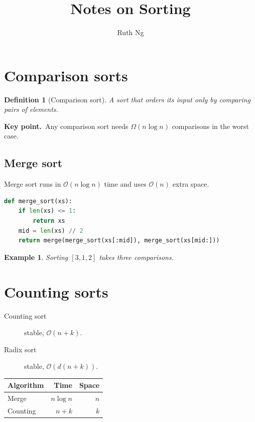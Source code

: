 \documentclass{article}
\title{Notes on Sorting}
\author{Ruth Ng}
\newtheorem{definition}{Definition}
\newtheorem{example}{Example}
\newcommand{\Oh}[1]{\mathcal{O}\!\left(#1\right)}
\newenvironment{keypoint}{\par\noindent\textbf{Key point.}\ }{\par}
\begin{document}
\maketitle
\tableofcontents
\section{Comparison sorts}
\begin{definition}[Comparison sort]
A sort that orders its input only by comparing pairs of elements.
\end{definition}
\begin{keypoint}Any comparison sort needs $\Omega(n\log n)$ comparisons in the worst case.\end{keypoint}
\subsection{Merge sort}
Merge sort runs in $\Oh{n\log n}$ time and uses $\Oh{n}$ extra space.
\begin{lstlisting}[language=Python]
def merge_sort(xs):
    if len(xs) <= 1:
        return xs
    mid = len(xs) // 2
    return merge(merge_sort(xs[:mid]), merge_sort(xs[mid:]))
\end{lstlisting}
\begin{example}
Sorting $[3,1,2]$ takes three comparisons.
\end{example}
\section{Counting sorts}
\begin{description}
  \item[Counting sort] stable, $\Oh{n+k}$.
  \item[Radix sort] stable, $\Oh{d(n+k)}$.
\end{description}
\begin{tabular}{|l|r|r|}
\hline
Algorithm & Time & Space \\ \hline
Merge & $n\log n$ & $n$ \\ \hline
Counting & $n+k$ & $k$ \\ \hline
\end{tabular}
\end{document}
